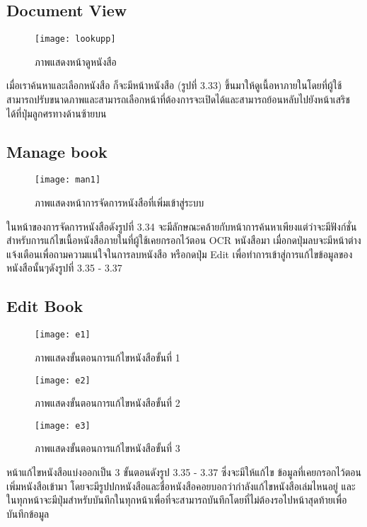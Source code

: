 \subsection{Document View}
\begin{figure}[H]
    \centering
    \texttt{[image: lookupp]}
    \caption{ภาพแสดงหน้าดูหนังสือ}\label{fig:lookupp}
\end{figure}
เมื่อเราค้นหาและเลือกหนังสือ ก็จะมีหน้าหนังสือ (รูปที่ 3.33) ขึ้นมาให้ดูเนื้อหาภายในโดยที่ผู้ใช้สามารถปรับขนาดภาพและสามารถเลือกหน้าที่ต้องการจะเปิดได้และสามารถย้อนหลับไปยังหน้าเสริชได้ที่ปุ่มลูกศรทางด้านซ้ายบน

\subsection{Manage book}
\begin{figure}[H]
    \centering
    \texttt{[image: man1]}
    \caption{ภาพแสดงหน้าการจัดการหนังสือที่เพิ่มเข้าสู่ระบบ}\label{fig:man1}
\end{figure}
ในหน้าของการจัดการหนังสือดังรูปที่ 3.34 จะมีลักษณะคล้ายกับหน้าการค้นหาเพียงแต่ว่าจะมีฟังก์ชั่นสำหรับการแก้ไขเนื้อหนังสือภายในที่ผู้ใช้เคยกรอกไว้ตอน OCR หนังสือมา เมื่อกดปุ่มลบจะมีหน้าต่างแจ้งเตือนเพื่อถามความแน่ใจในการลบหนังสือ หรือกดปุ่ม Edit เพื่อทำการเข้าสู่การแก้ไขข้อมูลของหนังสือนั้นๆดังรูปที่ 3.35 - 3.37

\subsection{Edit Book}
\begin{figure}[H]
    \centering
    \texttt{[image: e1]}
    \caption{ภาพแสดงขั้นตอนการแก้ไขหนังสือขั้นที่ 1}\label{fig:e1}
\end{figure}

\begin{figure}[H]
    \centering
    \texttt{[image: e2]}
    \caption{ภาพแสดงขั้นตอนการแก้ไขหนังสือขั้นที่ 2}\label{fig:e2}
\end{figure}

\begin{figure}[H]
    \centering
    \texttt{[image: e3]}
    \caption{ภาพแสดงขั้นตอนการแก้ไขหนังสือขั้นที่ 3}\label{fig:e3}
\end{figure}

หน้าแก้ไขหนังสือแบ่งออกเป็น 3 ขั้นตอนดังรูป 3.35 - 3.37 ซึ่งจะมีให้แก้ไข ข้อมูลที่เคยกรอกไว้ตอนเพิ่มหนังสือเข้ามา โดยจะมีรูปปกหนังสือและชื่อหนังสือคอยบอกว่ากำลังแก้ไขหนังสือเล่มไหนอยู่ และในทุกหน้าจะมีปุ่มสำหรับบันทึกในทุกหน้าเพื่อที่จะสามารถบันทึกโดยที่ไม่ต้องรอไปหน้าสุดท้ายเพื่อบันทึกข้อมูล

